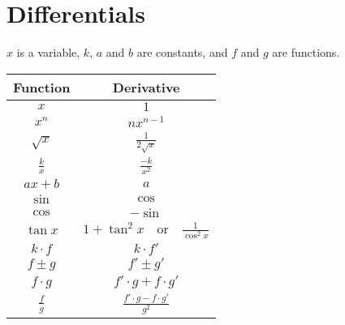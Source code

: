 \section{Differentials}
$x$ is a variable, $k$, $a$ and $b$ are constants, and $f$ and $g$ are functions.
\begin{center}
    \begin{longtable}{c|c}
        \textbf{Function} & \textbf{Derivative}
        \\[0.25cm] \hline
        $x$ & $1$
        \\
        $x^n$ & $nx^{n - 1}$
        \\
        $\sqrt{x}$ & $\frac{1}{2 \sqrt{x}}$
        \\
        $\frac{k}{x}$ & $\frac{-k}{x^2}$
        \\
        $ax + b$ & $a$
        \\
        $\sin$ & $\cos$
        \\
        $\cos$ & $-\sin$
        \\
        $\tan{x}$ & $1 + \tan^2{x} \quad \text{or} \quad \frac{1}{\cos^2{x}}$
        \\
        $k \cdot f$ & $k \cdot f'$
        \\
        $f \pm g$ & $f' \pm g'$
        \\
        $f \cdot g$ & $f' \cdot g + f \cdot g'$
        \\
        $\frac{f}{g}$ & $\frac{f' \cdot g - f \cdot g'}{g^2}$
    \end{longtable}
\end{center}
